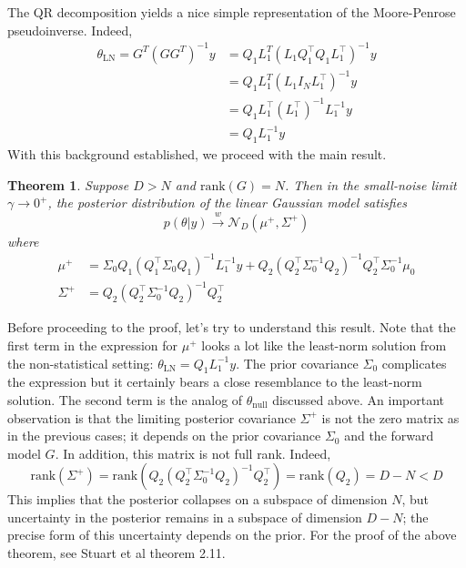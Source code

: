 \documentclass[12pt]{article}
\newtheorem{thm}{Theorem}
\begin{document}
The QR decomposition yields a nice simple representation of the Moore-Penrose pseudoinverse. Indeed, 
\begin{align*}
\theta_{\text{LN}} = G^T \left(G G^T \right)^{-1}y &= Q_1 L_1^T \left(L_1 Q_1^{\top} Q_1 L_1^{\top} \right)^{-1} y \\
									 &= Q_1 L_1^T \left(L_1 I_N L_1^{\top} \right)^{-1} y \\
									 &= Q_1 L_1^{\top} \left(L_1^{\top} \right)^{-1} L_1^{-1} y \\
									 &= Q_1 L_1^{-1} y
\end{align*}
With this background established, we proceed with the main result. 

\begin{thm}
Suppose $D > N$ and $\text{rank}(G) = N$. Then in the small-noise limit $\gamma \to 0^+$, the posterior distribution of the linear Gaussian model satisfies
\[p(\theta|y) \overset{w}{\to} \mathcal{N}_D(\mu^+, \Sigma^+)\]
where 
\begin{align*}
\mu^+ &= \Sigma_0 Q_1\left(Q_1^\top \Sigma_0 Q_1 \right)^{-1} L_1^{-1} y + Q_2\left(Q_2^\top \Sigma_0^{-1} Q_2 \right)^{-1} Q_2^\top \Sigma_0^{-1} \mu_0 \\
\Sigma^+ &= Q_2 \left(Q_2^\top \Sigma_0^{-1} Q_2 \right)^{-1} Q_2^\top
\end{align*}
\end{thm}
Before proceeding to the proof, let's try to understand this result. Note that the first term in the expression for $\mu^+$ looks a lot like the least-norm solution 
from the non-statistical setting: $\theta_{\text{LN}} = Q_1 L_1^{-1} y$. The prior covariance $\Sigma_0$ complicates the expression but it certainly bears a close 
resemblance to the least-norm solution. The second term is the analog of $\theta_{\text{null}}$ discussed above. An important observation is that the limiting posterior 
covariance $\Sigma^+$ is not the zero matrix as in the previous cases; it depends on the prior covariance $\Sigma_0$ and the forward model $G$. In addition, this matrix 
is not full rank. Indeed, 
\[\text{rank}\left(\Sigma^+\right) = \text{rank}\left(Q_2 \left(Q_2^\top \Sigma_0^{-1} Q_2 \right)^{-1} Q_2^\top \right) = \text{rank}\left(Q_2 \right) = D - N < D\]
This implies that the posterior collapses on a subspace of dimension $N$, but uncertainty in the posterior remains in a subspace of dimension $D - N$; the 
precise form of this uncertainty depends on the prior. For the proof of the above theorem, see Stuart et al theorem 2.11. 
\end{document}
